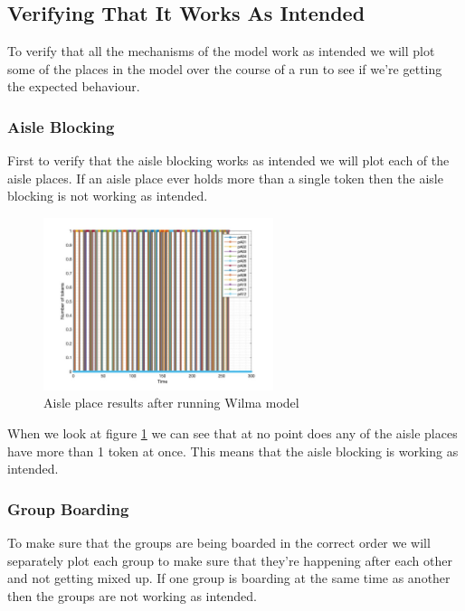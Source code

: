 \documentclass[english]{article}
\begin{document}
\subsection{Verifying That It Works As Intended}
To verify that all the mechanisms of the model work as intended we will plot some of the places in the model over the course of a run to see if we're getting the expected behaviour. 

\subsubsection{Aisle Blocking}
First to verify that the aisle blocking works as intended we will plot each of the aisle places. If an aisle place ever holds more than a single token then the aisle blocking is not working as intended.

\begin{figure}[H]
    \centering
    \includegraphics[width=0.6\textwidth]{figures/aisleblockcheck.jpg}
    \caption{Aisle place results after running Wilma model}
    \label{fig:aisle_block_check}
\end{figure}

When we look at figure \ref{fig:aisle_block_check} we can see that at no point does any of the aisle places have more than 1 token at once. This means that the aisle blocking is working as intended.

\subsubsection{Group Boarding}
To make sure that the groups are being boarded in the correct order we will separately plot each group to make sure that they're happening after each other and not getting mixed up. If one group is boarding at the same time as another then the groups are not working as intended. 
\end{document}

